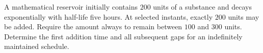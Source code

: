 A mathematical reservoir initially contains $200$ units of a substance and decays exponentially with half-life five hours. At selected instants, exactly $200$ units may be added. Require the amount always to remain between $100$ and $300$ units. Determine the first addition time and all subsequent gaps for an indefinitely maintained schedule.

